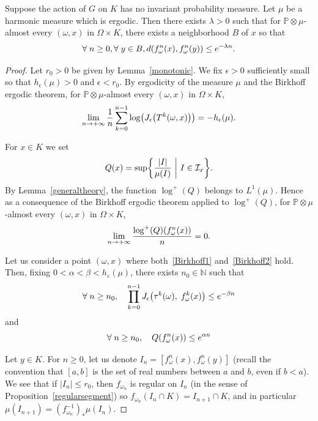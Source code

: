 \documentclass[AHL,Unicode,longabstracts,published]{cedram}
\newcommand{\bbP}{\mathbb{P}}
\newcommand{\clI}{\mathcal{I}}
\newcommand{\N}{\mathbb{N}}
\newcommand{\ep}{\varepsilon}
\renewcommand*{\to}{\mathchoice{\longrightarrow}{\rightarrow}{\rightarrow}{\rightarrow}}
\let\originalleft\left
\let\originalright\right
\renewcommand{\left}{\mathopen{}\mathclose\bgroup\originalleft}
\renewcommand{\right}{\aftergroup\egroup\originalright}
\let\oldforall\forall
\renewcommand*{\forall}{\mathrel{\oldforall}}
\begin{document}
\begin{lemm}\label{localcontrae}
Suppose the action of $G$ on $K$ has no invariant probability measure. Let $\mu$ be a harmonic measure which is ergodic. Then there exists $\lambda>0$ such that for $\bbP\otimes\mu$-almost every $(\omega,x)$ in $\Omega\times K$, there exists a neighborhood $B$ of $x$ so that
\[
\forall n \geq 0,\forall y\in B, d\left(f_\omega^n(x),f_\omega^n(y)\right) \leq e^{-\lambda n}.
\]
\end{lemm}
\begin{proof}
Let $r_0 >0$ be given by Lemma~\ref{monotonic}. We fix $\epsilon >0$ sufficiently small so that $h_{\epsilon}(\mu) >0$ and $\epsilon<r_0$. By ergodicity of the measure $\mu$ and the Birkhoff ergodic theorem, for $\bbP \otimes \mu$-almost every $(\omega,x)$ in $\Omega \times K$,
\begin{equation}\label{Birkhoff1}
\lim_{n \to + \infty} \frac{1}{n} \sum_{k=0}^{n-1} \log\left(J_{\epsilon}\left(T^{k}(\omega,x)\right)\right)=- h_{\epsilon}(\mu).
\end{equation}

For $x \in K$ we set
\[
Q(x)= \sup \left\{ \frac{|I|}{\mu(I)} \ \middle| \ I \in \clI_{x} \right\}.
\]
By Lemma~\ref{generaltheory}, the function $\log^{+}(Q)$ belongs to $L^{1}(\mu)$. Hence as a consequence of the Birkhoff ergodic theorem applied to $\log^{+}(Q)$, for $\bbP \otimes \mu$-almost every $(\omega,x)$ in $\Omega \times K$,
\begin{equation}\label{Birkhoff2}
\lim_{n \to + \infty} \frac{\log^{+}(Q)(f_{\omega}^{n}(x))}{n}=0.
\end{equation}

Let us consider a point $(\omega,x)$ where both~\eqref{Birkhoff1} and~\eqref{Birkhoff2} hold. Then, fixing $0<\alpha<\beta<h_\ep(\mu)$, there exists $n_0\in\N$ such that
\begin{equation}\label{bound1}
\forall n \geq n_0, \quad \prod_{k=0}^{n-1} J_{\epsilon}\left(\tau^{k}(\omega),\;f_{\omega}^{k}(x)\right) \leq e^{- \beta n}
\end{equation}
and
\begin{equation}\label{bound2}
\forall n \geq n_0,\quad Q\left(f_\omega^n(x)\right)\leq e^{\alpha n}
\end{equation}

Let $y \in K$. For $n\geq 0$, let us denote $I_n=[f_\omega^n(x),f_\omega^n(y)]$ (recall the convention that $[a,b]$ is the set of real numbers between $a$ and $b$, even if $b<a$). We see that if $|I_n|\leq r_0$, then $f_{\omega_n}$ is regular on $I_n$ (in the sense of Proposition~\ref{regularsegment}) so $f_{\omega_n}(I_n\cap K)=I_{n+1}\cap K$, and in particular $\mu(I_{n+1})=(f_{\omega_n}^{-1})_*\mu(I_n)$.


\end{proof}
\end{document}
